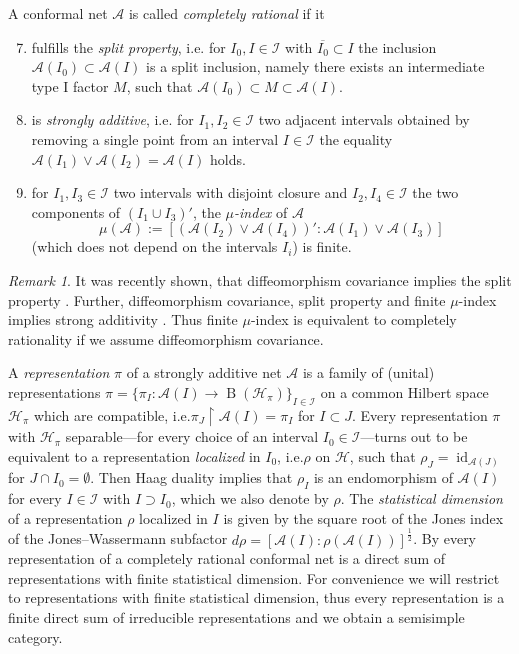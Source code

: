 \documentclass[twoside,11pt,reqno]{amsart}
\makeatletter
\theoremstyle{definition}
\theoremstyle{remark}
\newtheorem{rmk}[thm]{Remark}
\newcommand{\Hil}{\mathcal{H}}
\newcommand{\A}{\mathcal{A}}
\newcommand{\cI}{\mathcal{I}}
\DeclareMathOperator{\id}{id}
\DeclareMathOperator{\B}{B}
\DeclareRobustCommand{\ie}{i.e.\@\xspace}
\newcommand{\myemph}[1]{\emph{#1}}
\makeatother
\begin{document}
A conformal net $\A$ is called \myemph{completely rational} if it 
\begin{enumerate}[{\bf A.}]
  \setcounter{enumi}{6}
  \item fulfills the \myemph{split property}, \ie 
    for $I_0,I\in \cI$ with $\overline{I_0}\subset I$ the inclusion 
    $\A(I_0) \subset \A(I)$ is a split inclusion, namely there exists an 
    intermediate type I factor $M$, such that $\A(I_0) \subset M \subset \A(I)$.
  \item is \myemph{strongly additive}, \ie for $I_1,I_2 \in \cI$ two adjacent 
    intervals obtained by removing a single point from an interval $I\in\cI$
    the equality $\A(I_1) \vee \A(I_2) =\A(I)$ holds.
  \item for $I_1,I_3 \in \cI$ two intervals with disjoint closure and 
    $I_2,I_4\in\cI$  the two components of $(I_1\cup I_3)'$, the 
    \myemph{$\mu$-index} of $\A$
    \begin{equation*}
      \mu(\A):= [(\A(I_2) \vee \A(I_4))': \A(I_1)\vee \A(I_3) ]
    \end{equation*}
    (which does not depend on the intervals $I_i$) is finite.
\end{enumerate}

\begin{rmk}
  It was recently shown, that diffeomorphism covariance implies the split 
  property \cite{MoTaWe2016}. 
  Further, diffeomorphism covariance, split property and finite $\mu$-index 
  implies strong additivity \cite{LoXu2004}.
  Thus finite $\mu$-index is equivalent to completely rationality if we assume 
  diffeomorphism covariance.
\end{rmk}

A \myemph{representation} $\pi$ of a strongly additive net $\A$ 
is a family of (unital) representations
$\pi=\{\pi_I\colon\A(I)\to \B(\Hil_\pi)\}_{I\in\cI}$ on a common Hilbert space
$\Hil_\pi$ which are compatible, \ie  $\pi_J\restriction \A(I) =\pi_I$ for 
$I\subset J$.
Every representation $\pi$ with $\Hil_\pi$ separable---for every choice of an interval $I_0\in\cI$---turns out to be equivalent to a representation 
\myemph{localized} in $I_0$, \ie $\rho$ on $\Hil$, such that 
$\rho_J=\id_{\A(J)}$ for $J\cap I_0=\emptyset$. 
Then Haag duality implies that $\rho_{I}$ is an endomorphism of $\A(I)$ for 
every $I \in \cI$ with $I\supset I_0$, which we also denote by $\rho$.
The \myemph{statistical dimension} of a representation $\rho$ localized in $I$ 
is given by the square root of the Jones index
of the Jones--Wassermann subfactor $d\rho=[\A(I):\rho(\A(I))]^{\frac12}$.
By \cite[Cor.\ 39]{KaLoMg2001} every representation of a completely rational 
conformal net is a direct sum of representations with finite statistical 
dimension. 
For convenience we will restrict to representations with finite statistical dimension, thus every representation is a finite direct sum of irreducible 
representations and we obtain a semisimple category.
\end{document}
